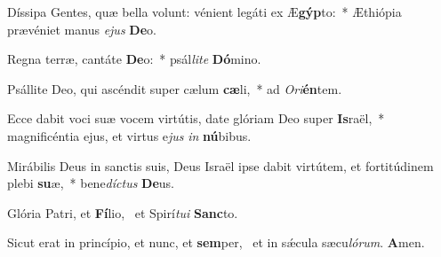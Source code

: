 \item Díssipa Gentes, quæ bella volunt: vénient legáti ex Æ\textbf{gýp}to:~* Æthiópia prævéniet manus \textit{e}\textit{jus} \textbf{De}o.
\item Regna terræ, cantáte \textbf{De}o:~* psál\textit{li}\textit{te} \textbf{Dó}mino.
\item Psállite Deo, qui ascéndit super cælum \textbf{cæ}li,~* ad \textit{O}\textit{ri}\textbf{én}tem.
\item Ecce dabit voci suæ vocem virtútis, date glóriam Deo super \textbf{Is}raël,~* magnificéntia ejus, et virtus e\textit{jus} \textit{in} \textbf{nú}bibus.
\item Mirábilis Deus in sanctis suis, Deus Israël ipse dabit virtútem, et fortitúdinem plebi \textbf{su}æ,~* bene\textit{díc}\textit{tus} \textbf{De}us.
\item Glória Patri, et \textbf{Fí}lio,~\psstar{} et Spirí\textit{tu}\textit{i} \textbf{Sanc}to.
\item Sicut erat in princípio, et nunc, et \textbf{sem}per,~\psstar{} et in sǽcula sæcu\textit{ló}\textit{rum}. \textbf{A}men.

